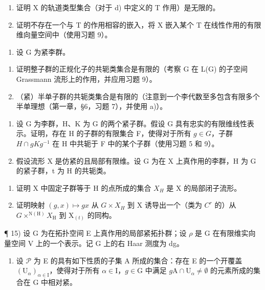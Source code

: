 \begin{enumerate}
\def\labelenumi{\alph{enumi})}
\setcounter{enumi}{4}
\item
  证明 X 的轨道类型集合（对于 d) 中定义的 T 作用）是无限的。
\item
  证明不存在一个与 T 的作用相容的嵌入，将 X 嵌入某个 T 在线性作用的有限维向量空间中（使用习题 9）。
\end{enumerate}

\begin{enumerate}
\def\labelenumi{\arabic{enumi})}
\setcounter{enumi}{11}
\tightlist
\item
  设 \(\mathrm{G}\) 为紧李群。
\end{enumerate}

\begin{enumerate}
\def\labelenumi{\alph{enumi})}
\item
  证明整子群的正规化子的共轭类集合是有限的（考察 G 在 L(G) 的子空间 Grassmann 流形上的作用，并应用习题 9）。
\item
  （紧）半单子群的共轭类集合是有限的（注意到一个李代数至多包含有限多个半单理想（第一章，§6，习题 7），并使用 a)）。
\end{enumerate}

\begin{enumerate}
\def\labelenumi{\arabic{enumi})}
\setcounter{enumi}{12}
\item
  设 G 为李群，H、K 为 G 的两个紧子群。假设 G 具有忠实的有限维线性表示。证明，存在 H 的子群的有限集合 F，使得对于所有 \(g \in G\)，子群 \(H \cap gKg^{-1}\) 在 H 中共轭于 F 中的某个子群（使用习题 5 和 9）。
\item
  假设流形 X 是仿紧的且局部有限维。设 G 为在 X 上真作用的李群，H 为 G 的紧子群，t 为 H 的共轭类。
\end{enumerate}

\begin{enumerate}
\def\labelenumi{\alph{enumi})}
\item
  证明 X 中固定子群等于 H 的点所成的集合 \(X_{H}\) 是 X 的局部闭子流形。
\item
  证明映射 \((g,x)\mapsto gx\) 从 \(G\times X_{H}\) 到 X 诱导出一个（类为 \(C^{r}\) 的）从 \(G\times^{\mathrm{N(H)}}X_{\mathrm{H}}\) 到 \(\mathrm{X}_{(t)}\) 的同构。
\end{enumerate}

¶ 15) 设 G 为在拓扑空间 E 上真作用的局部紧拓扑群；设 \(\rho\) 是 G 在有限维实向量空间 V 上的一个表示。记 G 上的右 Haar 测度为 dg。

\begin{enumerate}
\def\labelenumi{\alph{enumi})}
\tightlist
\item
  设 \(\mathcal{P}\) 为 E 的具有如下性质的子集 A 所成的集合：存在 E 的一个开覆盖 \((\mathrm{U}_{\alpha})_{\alpha \in \mathrm{I}}\)，使得对于所有 \(\alpha \in \mathrm{I}\)，\(g \in \mathrm{G}\) 中满足 \(g\mathrm{A} \cap \mathrm{U}_{\alpha} \neq \emptyset\) 的元素所成的集合在 G 中相对紧。
\end{enumerate}


